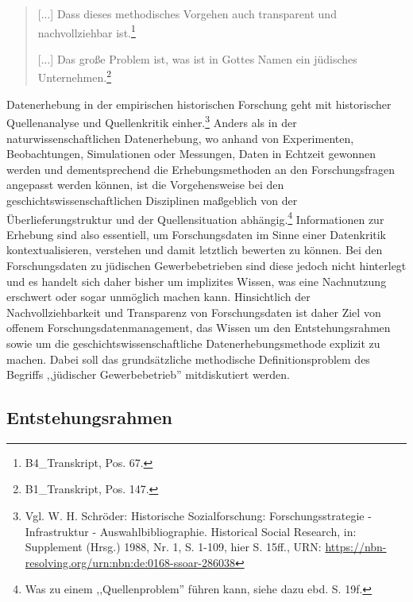 \begin{quote}
    [...] Dass dieses methodisches Vorgehen auch transparent und nachvollziehbar ist.\footnote{B4\_Transkript, Pos. 67.}

    [...] Das große Problem ist, was ist in Gottes Namen ein jüdisches Unternehmen.\footnote{B1\_Transkript, Pos. 147.}
\end{quote}

Datenerhebung in der empirischen historischen Forschung geht mit historischer Quellenanalyse und Quellenkritik einher.\footnote{Vgl. W. H. Schröder: Historische Sozialforschung: Forschungsstrategie - Infrastruktur - Auswahlbibliographie.
Historical Social Research, in: Supplement (Hrsg.) 1988, Nr. 1, S. 1-109, hier S. 15ff., URN: \url{https://nbn-resolving.org/urn:nbn:de:0168-ssoar-286038}
} Anders als in der naturwissenschaftlichen Datenerhebung, wo anhand von Experimenten, Beobachtungen, Simulationen oder Messungen, Daten in Echtzeit gewonnen werden und dementsprechend die Erhebungsmethoden an den Forschungsfragen angepasst werden können, ist die Vorgehensweise bei den geschichtswissenschaftlichen Disziplinen maßgeblich von der Überlieferungstruktur und der Quellensituation abhängig.\footnote{Was zu einem ,,Quellenproblem'' führen kann, siehe dazu ebd. S. 19f.} Informationen zur Erhebung sind also essentiell, um Forschungsdaten im Sinne einer Datenkritik kontextualisieren, verstehen und damit letztlich bewerten zu können. Bei den Forschungsdaten zu jüdischen Gewerbebetrieben sind diese jedoch nicht hinterlegt und es handelt sich daher bisher um implizites Wissen, was eine Nachnutzung erschwert oder sogar unmöglich machen kann. Hinsichtlich der Nachvollziehbarkeit und Transparenz von Forschungsdaten ist daher Ziel von offenem Forschungsdatenmanagement, das Wissen um den Entstehungsrahmen sowie um die geschichtswissenschaftliche Datenerhebungsmethode explizit zu machen. Dabei soll das grundsätzliche methodische Definitionsproblem des Begriffs ,,jüdischer Gewerbebetrieb'' mitdiskutiert werden.

\subsection{Entstehungsrahmen}

